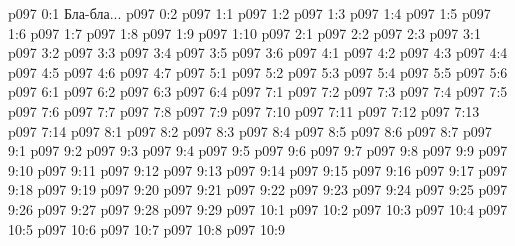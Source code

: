 \author{Мелхиседек}
\vs p097 0:1  Бла-бла...
\vs p097 0:2 
\vs p097 1:1 
\vs p097 1:2 
\vs p097 1:3 
\vs p097 1:4 
\vs p097 1:5 
\vs p097 1:6 \pc 
\vs p097 1:7 
\vs p097 1:8 
\vs p097 1:9 \pc 
\vs p097 1:10 
\vs p097 2:1 
\vs p097 2:2 
\vs p097 2:3 
\vs p097 3:1 
\vs p097 3:2 \pc 
\vs p097 3:3 
\vs p097 3:4 
\vs p097 3:5 
\vs p097 3:6 
\vs p097 4:1 
\vs p097 4:2 
\vs p097 4:3 
\vs p097 4:4 
\vs p097 4:5 \pc 
\vs p097 4:6 
\vs p097 4:7 \pc 
{}
\vs p097 5:1 
\vs p097 5:2 
\vs p097 5:3 
\vs p097 5:4 \pc 
\vs p097 5:5 
\vs p097 5:6 
\vs p097 6:1 
\vs p097 6:2 
\vs p097 6:3 
\vs p097 6:4 
\vs p097 7:1 
\vs p097 7:2 
\vs p097 7:3 
\vs p097 7:4 
\vs p097 7:5 \pc 
\vs p097 7:6 
\vs p097 7:7 
\vs p097 7:8 
\vs p097 7:9 
\vs p097 7:10 
\vs p097 7:11 
\vs p097 7:12 
\vs p097 7:13 
\vs p097 7:14 
\vs p097 8:1 
\vs p097 8:2 
\vs p097 8:3 
\vs p097 8:4 
\vs p097 8:5 \pc 
\vs p097 8:6 
\vs p097 8:7 \pc 
{}
\vs p097 9:1 
\vs p097 9:2 
\vs p097 9:3 \pc 
\vs p097 9:4 
\vs p097 9:5 
\vs p097 9:6 
\vs p097 9:7 
\vs p097 9:8 \pc 
\vs p097 9:9 
\vs p097 9:10 \pc 
\vs p097 9:11 
\vs p097 9:12 
\vs p097 9:13 
\vs p097 9:14 
\vs p097 9:15 
\vs p097 9:16 \pc 
\vs p097 9:17 \pc 
\vs p097 9:18 
\vs p097 9:19 
\vs p097 9:20 \pc 
\vs p097 9:21 \pc 
\vs p097 9:22 
\vs p097 9:23 \pc 
\vs p097 9:24 
\vs p097 9:25 
\vs p097 9:26 
\vs p097 9:27 \pc 
\vs p097 9:28 
\vs p097 9:29 \pc 
{}
\vs p097 10:1 
\vs p097 10:2 
\vs p097 10:3 
\vs p097 10:4 
\vs p097 10:5 \pc 
\vs p097 10:6 
\vs p097 10:7 
\vs p097 10:8 \pc 
\vsetoff
\vs p097 10:9 
\quizlink
